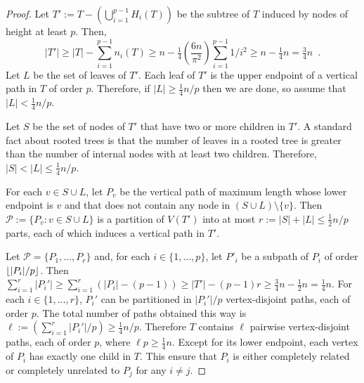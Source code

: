 \documentclass[kpfonts,lotsofwhite]{patmorin}
\DeclarePairedDelimiter{\floor}{\lfloor}{\rfloor}
\renewcommand{\ge}{\geqslant}
\renewcommand{\le}{\leqslant}
\theoremstyle{plain}
\theoremstyle{definition}
\begin{document}
\begin{proof}
  Let $T':=T-(\bigcup_{i=1}^{p-1} H_i(T))$ be the subtree of $T$ induced by nodes of height at least $p$.  Then,
  \[
    |T'|\ge |T| - \sum_{i=1}^{p-1} n_i(T)
    \ge n - \tfrac{1}{4}\left(\frac{6n}{\pi^2}\right)\sum_{i=1}^{p-1} 1/i^2
    \ge  n - \tfrac{1}{4}n = \tfrac{3}{4}n \enspace .
  \]
  Let $L$ be the set of leaves of $T'$.  Each leaf of $T'$ is the upper endpoint of a vertical path in $T$ of order $p$.  Therefore, if $|L|\ge \tfrac{1}{4}n/p$ then we are done, so assume that $|L|<\tfrac{1}{4}n/p$.

  Let $S$ be the set of nodes of $T'$ that have two or more children in $T'$.  A standard fact about rooted trees is that the number of leaves in a rooted tree is greater than the number of internal nodes with at least two children.  Therefore, $|S|<|L|\le \tfrac{1}{4}n/p$.

  For each $v\in S\cup L$, let $P_v$ be the vertical path of maximum length whose lower endpoint is $v$ and that does not contain any node in $(S\cup L)\setminus \{v\}$.  Then $\mathcal{P}:=\{P_v:v\in S\cup L\}$ is a partition of $V(T')$ into at most $r:=|S|+|L|\le \tfrac{1}{2}n/p$ parts, each of which induces a vertical path in $T'$.

  Let $\mathcal{P}=\{P_1,\ldots,P_r\}$ and, for each $i\in\{1,\ldots,p\}$, let $P'_i$ be a subpath of $P_i$ of order $\floor{|P_i|/p}$.  Then $\sum_{i=1}^r |P_i'|\ge \sum_{i=1}^r (|P_i|-(p-1)) \ge |T'| - (p-1)r\ge \tfrac{3}{4}n-\tfrac{1}{2}n=\tfrac{1}{4}n$. For each $i\in\{1,\ldots,r\}$, $P_i'$ can be partitioned in $|P_i'|/p$ vertex-disjoint paths, each of order $p$.  The total number of paths obtained this way is $\ell := (\sum_{i=1}^r |P_i'|/p) \ge \tfrac{1}{4}n/p$.  Therefore $T$ contains $\ell$ pairwise vertex-disjoint paths, each of order $p$, where $\ell p \ge \tfrac{1}{4}n$.  Except for its lower endpoint, each vertex of $P_i$ has exactly one child in $T$.  This ensure that $P_i$ is either completely related or completely unrelated to $P_j$ for any $i\neq j$.
\end{proof}
\end{document}

